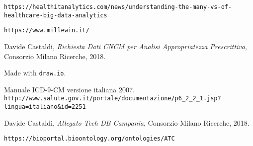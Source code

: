 \begin{thebibliography}{}
	
	\texttt{https://healthitanalytics.com/news/understanding-the-many-vs-of-healthcare-big-data-analytics}
	
	\texttt{https://www.millewin.it/}
	
	Davide Castaldi, \textit{Richiesta Dati CNCM per Analisi Appropriatezza Prescrittiva}, Consorzio Milano Ricerche, 2018.
	
	Made with \texttt{draw.io}.
	
	Manuale ICD-9-CM versione italiana 2007. \\
	\texttt{http://www.salute.gov.it/portale/documentazione/p6\_2\_2\_1.jsp?lingua=italiano\&id=2251}
	
	Davide Castaldi, \textit{Allegato Tech DB Campania}, Consorzio Milano Ricerche, 2018.
	
	\texttt{https://bioportal.bioontology.org/ontologies/ATC} 
	
\end{thebibliography}
	